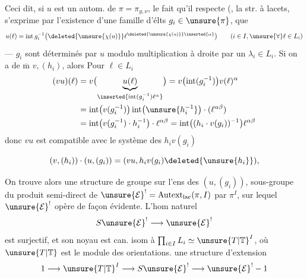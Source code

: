 Ceci dit, si $u$ est un autom. de $\pi=\pi_{g,\nu}$, le fait qu'il respecte (,  la str. à lacets, s'exprime par l'existence d'une famille d'élts $g_i\in\unsure{\pi}$,  que
\[
u(\ell)=\operatorname{int}g_i^{-1}\bigl(\deleted{\unsure{\chi(u)}}\ell^{\deleted{\unsure{\chi(u)}}\inserted{\alpha}}\bigr)
\qquad(i\in I,\unsure{\forall}\ell\in L_i)
\]
---  $g_i$ sont déterminés par $u$  modulo multiplication à droite par un $\lambda_i\in L_i$. Si on a de $\overline{\mathrm m}$ $v,(h_i)$, alors  Pour $\ell\in L_i$ 
\[
\begin{aligned}
(vu)(\ell)
&=v\bigl(\underbrace{u(\ell)}_{\inserted{\operatorname{int}(g_i^{-1})\ell^{\alpha}}}\bigr)
=v\bigl(\operatorname{int}(g_i^{-1})\bigr)v(\ell)^{\alpha}\\
&=\operatorname{int}\bigl(v(g_i^{-1})\bigr)\operatorname{int}\bigl(\unsure{h_i^{-1}}\bigr)\cdot(\ell^{\alpha\beta})\\
&=\operatorname{int}\bigl(v(g_i^{-1})\cdot h_i^{-1}\bigr)\cdot\ell^{\alpha\beta}
=\operatorname{int}\bigl((h_i\cdot v(g_i))^{-1}\bigr)\ell^{\alpha\beta}
\end{aligned}
\]
donc $vu$ est compatible avec le système des  $h_i v(g_i)$ 

\[
(v,(h_i))\cdot(u,(g_i))=(vu,h_i v(g_i)\deleted{\unsure{h_i}}),
\]

On trouve alors une structure de groupe sur l'ens  des $(u,(g_i))$, sous-groupe du produit semi-direct de $\unsure{\mathcal E}^{!}=\mathrm{Autext}_{\mathrm{lac}}(\pi,I)$  par $\pi^I$, sur lequel $\unsure{\mathcal E}^{!}$ opère de façon évidente. L'hom naturel
\[
S\unsure{\mathcal E}^{!}\longrightarrow\unsure{\mathcal E}^{!}
\]
est surjectif, et son noyau est can. isom à $\prod_{i\in I} L_i\simeq \unsure{T|\mathbb T}^I$, où $\unsure{T|\mathbb T}$ est le module des orientations.
 une structure d'extension 
\[
1\longrightarrow \unsure{T|\mathbb T}^I\longrightarrow S\unsure{\mathcal E}^{!}\longrightarrow\unsure{\mathcal E}^{!}-1
\]

